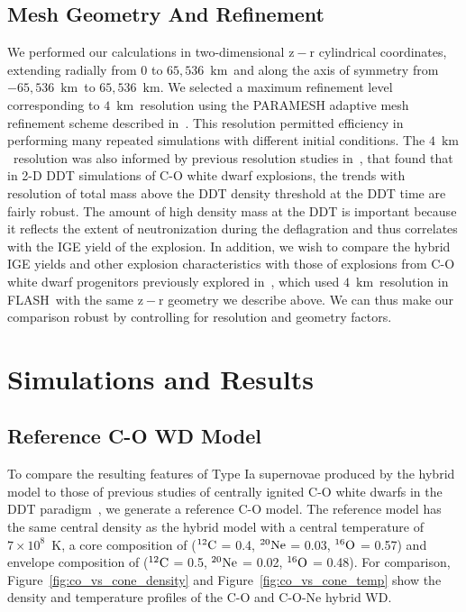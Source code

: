\documentclass[iop,apj]{emulateapj}
\newcommand{\figref}[1]{Figure~\ref{#1}}
\newcommand{\C}[1]{\ensuremath{{}^{#1}{\rm C}}}
\newcommand{\Ox}[1]{\ensuremath{{}^{#1}{\rm O}}}
\newcommand{\Ne}[1]{\ensuremath{{}^{#1}{\rm Ne}}}
\newcommand{\code}[1]{\textsc{#1}}
\newcommand{\FLASH}{\code{FLASH}}
\newcommand{\unitstyle}[1]{\ensuremath{\mathrm{#1}}}
\newcommand{\kilo}{\unitstyle{k}}
\newcommand{\meter}{\unitstyle{m}}
\newcommand{\km}{\kilo\meter}   %
\begin{document}
\subsection{Mesh Geometry And Refinement}
\label{subsec:flash_geometry}
We performed our calculations in two-dimensional $\mathrm{z-r}$
cylindrical coordinates, extending radially from 0 to
$65,536$~\km\ and along the axis of symmetry from $-65,536$~\km\ to
$65,536$~\km. We selected a maximum refinement level corresponding to
$4$~\km\ resolution using the PARAMESH adaptive mesh refinement scheme
described in~\citet{Fryxetal00}. This resolution permitted efficiency
in performing many repeated simulations with different initial
conditions. The $4$~\km\ resolution was also informed by previous
resolution studies in~\citet{townsley.calder.ea:flame,townetal2009},
that found that in 2-D DDT simulations of C-O white dwarf explosions,
the trends with resolution of total mass above the DDT density
threshold at the DDT time are fairly robust. The amount of high
density mass at the DDT is important because it reflects the extent of
neutronization during the deflagration and thus correlates with the
IGE yield of the explosion. In addition, we wish to compare the hybrid
IGE yields and other explosion characteristics with those of
explosions from C-O white dwarf progenitors previously explored
in~\citet{kruegetal12}, which used $4$~\km\ resolution in \FLASH\ with
the same $\mathrm{z-r}$ geometry we describe above. We can thus make
our comparison robust by controlling for resolution and geometry
factors.

\section{Simulations and Results}
\subsection{Reference C-O WD Model}\label{refcomodel}
To compare the resulting features of Type Ia supernovae produced by
the hybrid model to those of previous studies of centrally ignited C-O
white dwarfs in the DDT
paradigm~\citep{Krueger2010On-Variations-o,kruegetal12}, we generate a
reference C-O model. The reference model has the same central density
as the hybrid model with a central temperature of $7 \times 10^8$~K, a
core composition of (\C{12} = 0.4, \Ne{20} = 0.03, \Ox{16} = 0.57) and
envelope composition of (\C{12} = 0.5, \Ne{20} = 0.02, \Ox{16} =
0.48). For comparison, \figref{fig:co_vs_cone_density} and
\figref{fig:co_vs_cone_temp} show the density and temperature profiles of
the C-O and C-O-Ne hybrid WD.
\end{document}
